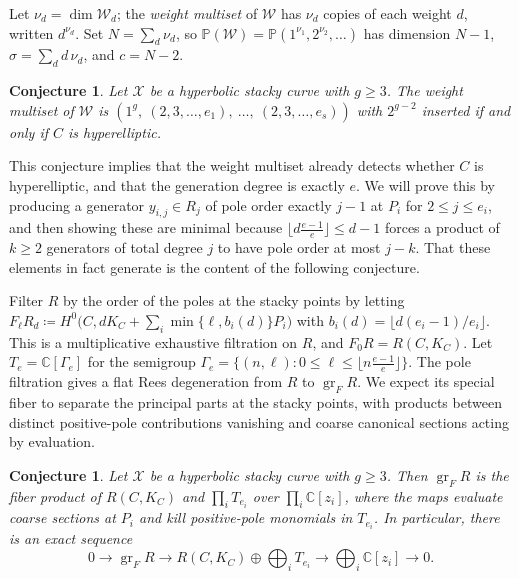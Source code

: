 \documentclass[11pt,reqno]{amsart}
\newtheorem{conjecture}[lemma]{Conjecture}
\theoremstyle{remark}
\newcommand{\CC}{\mathbb{C}}
\newcommand{\PP}{\mathbb{P}}
\newcommand{\cW}{\mathcal{W}}
\newcommand{\cX}{\mathcal{X}}
\begin{document}
Let $\nu_d = \dim \cW_d$; the \emph{weight multiset} of $\cW$ has $\nu_d$ copies of each weight $d$, written $d^{\nu_d}$. Set $N = \sum_d \nu_d$, so $\PP(\cW)=\PP(1^{\nu_1},2^{\nu_2},\ldots)$ has dimension $N-1$, $\sigma = \sum_d d\,\nu_d$, and $c = N-2$.


\begin{conjecture}\label{conj:weights}
Let $\cX$ be a hyperbolic stacky curve with $g\geq3$. The weight multiset of $\cW$ is $(1^{g},\ (2,3,\ldots,e_1),\ \ldots,\ (2,3,\ldots,e_s))$  with $2^{g-2}$ inserted if and only if $C$ is hyperelliptic.
\end{conjecture}

This conjecture implies that the weight multiset already detects whether $C$ is hyperelliptic, and that the generation degree is exactly $e$. We will prove this by producing a generator $y_{i,j}\in R_j$ of pole order exactly $j-1$ at $P_i$ for $2\leq j\leq e_i$, and then showing these are minimal because $\lfloor d\tfrac{e-1}{e}\rfloor\leq d-1$ forces a product of $k\geq2$ generators of total degree $j$ to have pole order at most $j-k$. That these elements in fact generate is the content of the following conjecture.

Filter $R$ by the order of the poles at the stacky points by letting $F_{\ell}R_d \coloneqq H^0\big(C,dK_C+\sum_i\min\{\ell,b_i(d)\}P_i\big)$ with $b_i(d)=\lfloor d(e_i-1)/e_i\rfloor$. This is a multiplicative exhaustive filtration on $R$, and $F_{0}R = R(C, K_C)$. Let $T_e = \CC[\Gamma_e]$ for the semigroup $\Gamma_e=\{(n,\ell):0\leq\ell\leq\lfloor n\tfrac{e-1}{e}\rfloor\}$. The pole filtration gives a flat Rees degeneration from $R$ to $\operatorname{gr}_F R$. We expect its special fiber to separate the principal parts at the stacky points, with products between distinct positive-pole contributions vanishing and coarse canonical sections acting by evaluation.

\begin{conjecture}\label{conj:degeneration}
Let $\cX$ be a hyperbolic stacky curve with $g\geq3$. Then $\operatorname{gr}_F R$ is the fiber product of $R(C,K_C)$ and $\prod_iT_{e_i}$ over $\prod_i\CC[z_i]$, where the maps evaluate coarse sections at $P_i$ and kill positive-pole monomials in $T_{e_i}$. In particular, there is an exact sequence
\begin{equation}\label{eq:fiber}
0\longrightarrow\operatorname{gr}_F R
\longrightarrow R(C,K_C)\oplus\bigoplus_iT_{e_i}
\longrightarrow\bigoplus_i\CC[z_i]
\longrightarrow0.
\end{equation}
\end{conjecture}
\end{document}
